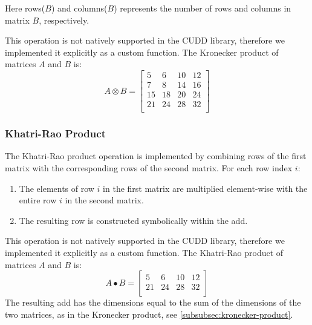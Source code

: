 Here rows($B$) and columns($B$) represents the number of rows and columns in matrix $B$, respectively.

This operation is not natively supported in the CUDD library, therefore we implemented it explicitly as a custom function. 
The Kronecker product of matrices $A$ and $B$ is:
\[
    A \otimes B = \begin{bmatrix}
        5  & 6  & 10 & 12 \\
        7  & 8  & 14 & 16 \\
        15 & 18 & 20 & 24 \\
        21 & 24 & 28 & 32 \\
    \end{bmatrix}
\]

\subsubsection{Khatri-Rao Product}
The Khatri-Rao product operation is implemented by combining rows of the first matrix with the corresponding rows of the second matrix. For each row index $i$:
\begin{enumerate}
    \item The elements of row $i$ in the first matrix are multiplied element-wise with the entire row $i$ in the second matrix.
    \item The resulting row is constructed symbolically within the \gls{add}.   
\end{enumerate}
This operation is not natively supported in the CUDD library, therefore we implemented it explicitly as a custom function.
The Khatri-Rao product of matrices $A$ and $B$ is:
\[
    A \bullet B = \begin{bmatrix}
        5  & 6  & 10 & 12 \\
        21 & 24 & 28 & 32 \\
    \end{bmatrix}
\]
The resulting \gls{add} has the dimensions equal to the sum of the dimensions of the two matrices, as in the Kronecker product, see \autoref{subsubsec:kronecker-product}.
